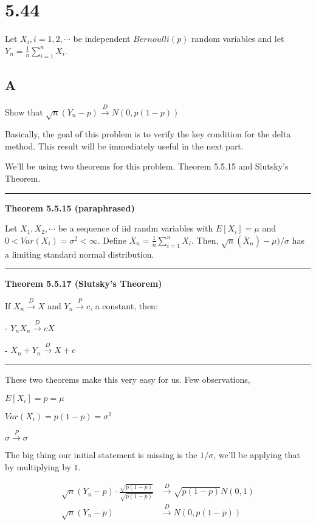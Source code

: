 \section{5.44} 

Let $X_i, i=1,2,\cdots$ be independent $Bernoulli(p)$ random variables and let $Y_n = \frac{1}{n} \sum_{i=1}^n X_i$.

\subsection*{A}

Show that $\sqrt{n}(Y_n - p) \xrightarrow{D} N(0, p(1-p))$

Basically, the goal of this problem is to verify the key condition for the delta method. This result will be immediately useful in the next part. 

We'll be using two theorems for this problem. Theorem 5.5.15 and Slutsky's Theorem. 

\vspace{5mm}
\hrule
\vspace{5mm}
\noindent\textbf{Theorem 5.5.15 (paraphrased)}

Let $X_1, X_2, \cdots$ be a sequence of iid randm variables with $E[X_i] = \mu$ and $0 < Var(X_i) = \sigma^2 < \infty$. Define $\bar{X}_n = \frac{1}{n} \sum_{i=1}^n X_i$. Then, $\sqrt{n}(\bar{X}_n) - \mu)/\sigma$ has a limiting standard normal distribution.

\vspace{5mm}
\hrule
\vspace{5mm}

\noindent\textbf{Theorem 5.5.17 (Slutsky's Theorem)}

If $X_n \xrightarrow{D} X$ and $Y_n \xrightarrow{P} c$, a constant, then:

- $Y_nX_n \xrightarrow{D} cX$

- $X_n + Y_n \xrightarrow{D} X+c$
\vspace{5mm}
\hrule
\vspace{5mm}

These two theorems make this very easy for us. Few observations, 

$E[X_i] = p = \mu$

$Var(X_i) = p(1-p) = \sigma^2$

$\sigma \xrightarrow{P} \sigma$

The big thing our initial statement is missing is the $1/\sigma$, we'll be applying that by multiplying by $1$.

\begin{align*}
	\sqrt{n}(Y_n - p) \cdot \frac{\sqrt{p(1-p)}}{\sqrt{p(1-p)}} &\xrightarrow{D} \sqrt{p(1-p)}N(0, 1) \\
	\sqrt{n}(Y_n - p) &\xrightarrow{D} N(0, p(1-p))
\end{align*}

